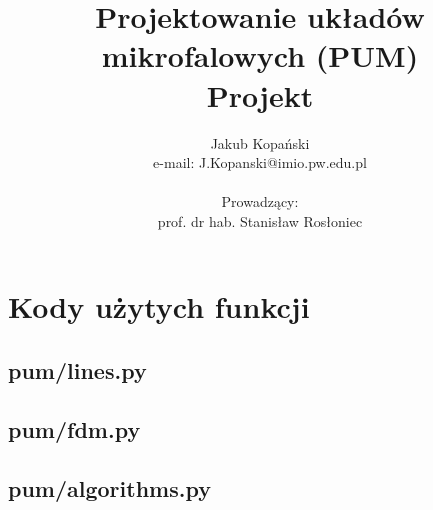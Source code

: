 \documentclass[a4paper,twoside]{mwrep}
\begin{document}
\title{Projektowanie układów mikrofalowych (PUM)\\Projekt}

\author{Jakub Kopański\\
e-mail: J.Kopanski@imio.pw.edu.pl\\
\\
Prowadzący:\\
prof. dr hab. Stanisław Rosłoniec
}

\maketitle
\cleardoublepage
\tableofcontents
\clearpage
\listoffigures
\cleardoublepage

 















\appendix
\chapter{Kody użytych funkcji}
\section{pum/lines.py}

\section{pum/fdm.py}

\section{pum/algorithms.py}


\nocite{*}


\end{document}
